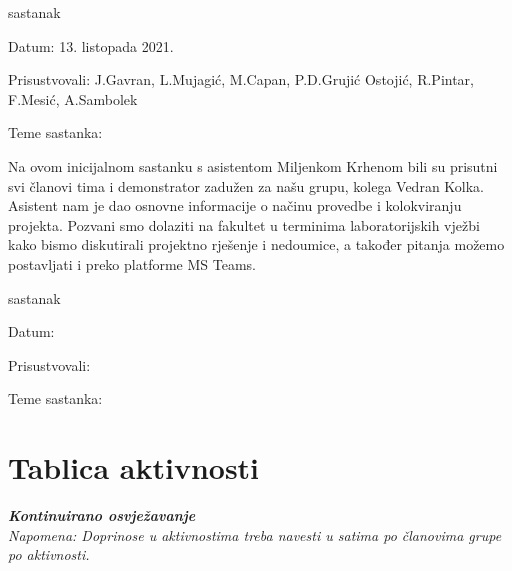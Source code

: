 \begin{packed_enum}
			\item  sastanak
			\item[] \begin{packed_item}
				\item Datum: 13. listopada 2021.
				\item Prisustvovali: J.Gavran, L.Mujagić, M.Capan, P.D.Grujić Ostojić, R.Pintar, F.Mesić, A.Sambolek
				\item Teme sastanka:
				\begin{packed_item}
					\item  Na ovom inicijalnom sastanku s asistentom Miljenkom Krhenom bili su prisutni svi članovi tima i demonstrator zadužen za našu grupu, kolega Vedran Kolka.
					Asistent nam je dao osnovne informacije o načinu provedbe i kolokviranju projekta. Pozvani smo dolaziti na fakultet u terminima laboratorijskih vježbi kako bismo
					diskutirali projektno rješenje i nedoumice, a također pitanja možemo postavljati i preko platforme MS Teams.
					
				\end{packed_item}
			\end{packed_item}
			\item  sastanak
		\item[] \begin{packed_item}
			\item Datum: 
			\item Prisustvovali:
			\item Teme sastanka:
			\begin{packed_item}
				\item
			\end{packed_item}
		\end{packed_item}
			
			
		\end{packed_enum}
		
		\eject
		\section*{Tablica aktivnosti}
		
			\textbf{\textit{Kontinuirano osvježavanje}}\\
			
			 \textit{Napomena: Doprinose u aktivnostima treba navesti u satima po članovima grupe po aktivnosti.}

